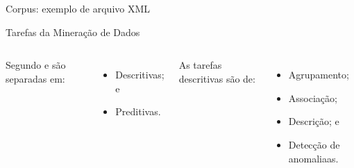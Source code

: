 \documentclass[%
  10pt,%
  aspectratio = 169,%
  compress,%
  t,%
]{beamer}%
\begin{document}
    \begin{frame}[fragile = singleslide]{}{Corpus: exemplo de arquivo XML}
        
    \end{frame}


    \begin{frame}[fragile = singleslide]{}{Tarefas da Mineração de Dados}
        \begin{columns}[t]
        Segundo \cite[p.~7]{TanIDM2014} e \cite[p.~15]{Han:2011:DMC:1972541} são separadas em:
        \begin{itemize}
            \item Descritivas; e
            \item Preditivas.
        \end{itemize}

        As tarefas descritivas são de:
        \begin{itemize}
            \item Agrupamento;
            \item Associação;
            \item Descrição; e
            \item Detecção de anomaliaas.
        \end{itemize}

        
        \end{columns}
    \end{frame}
\end{document}
